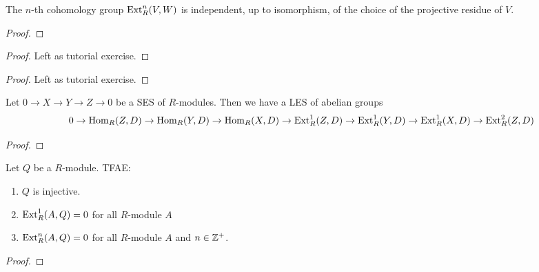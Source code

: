 \begin{thm}
    The $n$-th cohomology group $\operatorname{Ext}^n_R(V,W)$ is independent, up to isomorphism, of the choice of the projective residue of $V$.
\end{thm}
\begin{proof}
\end{proof}

\begin{thm} 
\end{thm}
\begin{proof}
    Left as tutorial exercise.
\end{proof}

\begin{thm} 
\end{thm}
\begin{proof}
    Left as tutorial exercise.
\end{proof}

\begin{thm}
    Let $0\to X\to Y\to Z\to 0$ be a SES of $R$-modules. Then we have a LES of abelian groups 
    \[0 \to \operatorname{Hom}_R(Z,D) \to \operatorname{Hom}_R(Y,D) \to \operatorname{Hom}_R(X,D) \to \operatorname{Ext}^1_R(Z,D) \to \operatorname{Ext}^1_R(Y,D) \to \operatorname{Ext}^1_R(X,D) \to \operatorname{Ext}^2_R(Z,D)\]
\end{thm}
\begin{proof}
\end{proof}

\begin{thm}
    Let $Q$ be a $R$-module. TFAE:
    \begin{enumerate}
        \item $Q$ is injective.
        \item $\operatorname{Ext}^1_R(A,Q)=0$ for all $R$-module $A$
        \item $\operatorname{Ext}^n_R(A,Q)=0$ for all $R$-module $A$ and $n\in{\mathbb Z}^+$.
    \end{enumerate}
\end{thm}
\begin{proof}
\end{proof}


